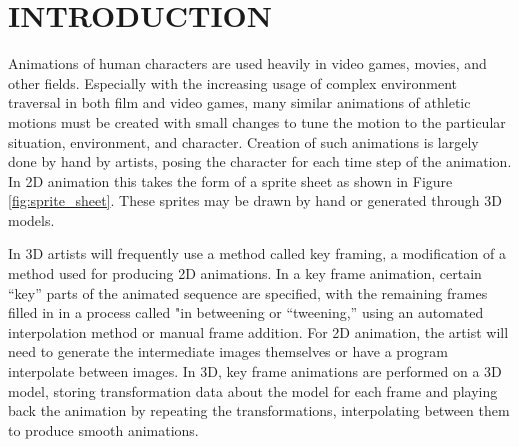 
 
\chapter{INTRODUCTION}
\label{chapter:intro}

Animations of human characters are used heavily in video games, movies, and other fields.  Especially with the increasing usage of complex environment traversal in both film and video games, many similar animations of athletic motions must be created with small changes to tune the motion to the particular situation, environment, and character.  Creation of such animations is largely done by hand by artists, posing the character for each time step of the animation.  In 2D animation this takes the form of a sprite sheet as shown in Figure \ref{fig:sprite_sheet}.  These sprites may be drawn by hand or generated through 3D models.

In 3D artists will frequently use a method called key framing, a modification of a method used for producing 2D animations.  In a key frame animation, certain ``key'' parts of the animated sequence are specified, with the remaining frames filled in in a process called "in betweening or ``tweening,'' using an automated interpolation method or manual frame addition.  For 2D animation, the artist will need to generate the intermediate images themselves or have a program interpolate between images.  In 3D, key frame animations are performed on a 3D model, storing transformation data about the model for each frame and playing back the animation by repeating the transformations, interpolating between them to produce smooth animations.

